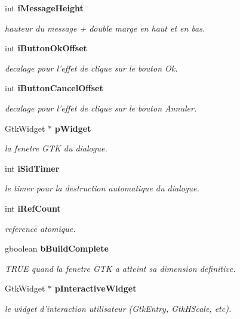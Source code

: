 \begin{CompactItemize}
int {\bf iMessageHeight}
\begin{CompactList}\small\item\em hauteur du message + double marge en haut et en bas. \item\end{CompactList}\item 
int {\bf iButtonOkOffset}
\begin{CompactList}\small\item\em decalage pour l'effet de clique sur le bouton Ok. \item\end{CompactList}\item 
int {\bf iButtonCancelOffset}
\begin{CompactList}\small\item\em decalage pour l'effet de clique sur le bouton Annuler. \item\end{CompactList}\item 
GtkWidget $\ast$ {\bf pWidget}
\begin{CompactList}\small\item\em la fenetre GTK du dialogue. \item\end{CompactList}\item 
int {\bf iSidTimer}
\begin{CompactList}\small\item\em le timer pour la destruction automatique du dialogue. \item\end{CompactList}\item 
int {\bf iRefCount}
\begin{CompactList}\small\item\em reference atomique. \item\end{CompactList}\item 
gboolean {\bf bBuildComplete}
\begin{CompactList}\small\item\em TRUE quand la fenetre GTK a atteint sa dimension definitive. \item\end{CompactList}\item 
GtkWidget $\ast$ {\bf pInteractiveWidget}
\begin{CompactList}\small\item\em le widget d'interaction utilisateur (GtkEntry, GtkHScale, etc). \item\end{CompactList}\item 

\end{CompactItemize}
